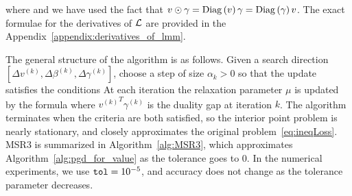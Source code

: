 where 
and we have used the fact that  $v\odot \gamma=\mathrm{Diag}\left(v\right)\gamma=\mathrm{Diag}\left(\gamma\right)v$. 
The exact formulae for the derivatives of $\operatorname{\mathcal{L}}$ are provided in the Appendix~\ref{appendix:derivatives_of_lmm}.

The general structure of the algorithm is as follows.
Given a search direction
$[\Delta v^{(k)}, \Delta \beta^{(k)}, \Delta \gamma^{(k)}]$, 
choose a step of size $\alpha_k>0$
so that the update
satisfies the conditions
At each iteration the relaxation parameter $\mu$ is updated by the formula 
where ${v^{(k)}}^T\gamma^{(k)}$ is the duality gap at
iteration $k$. The algorithm terminates when the criteria 
are both satisfied, so the interior point problem is nearly stationary, and closely approximates the original problem~\eqref{eq:ineqLoss}.
MSR3 is summarized in Algorithm~\ref{alg:MSR3}, which approximates Algorithm~\ref{alg:pgd_for_value} as the tolerance goes to $0$. 
In the numerical experiments, we use $\text{\texttt{tol}} = 10^{-5}$, and accuracy does not change as the tolerance parameter decreases.  

